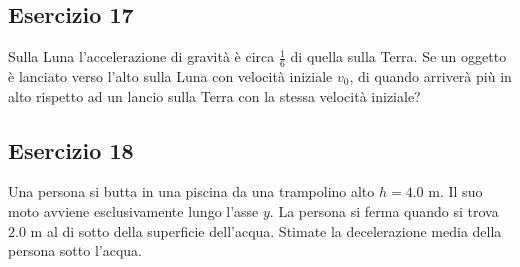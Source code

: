 \documentclass[12pt,a4paper]{book}
\begin{document}
\subsection*{Esercizio 17} 
Sulla Luna l'accelerazione di gravità è circa $\frac{1}{6}$ di quella sulla Terra. Se un oggetto è lanciato verso l'alto sulla Luna con velocità iniziale $v_0$, di quando arriverà più in alto rispetto ad un lancio sulla Terra con la stessa velocità iniziale?


\subsection*{Esercizio 18} 
Una persona si butta in una piscina da una trampolino alto $h=4.0$ m. Il suo moto avviene esclusivamente lungo l'asse $y$.
La persona si ferma quando si trova $2.0$ m al di sotto della superficie dell'acqua. Stimate la decelerazione media della persona sotto l'acqua.

\end{document}
